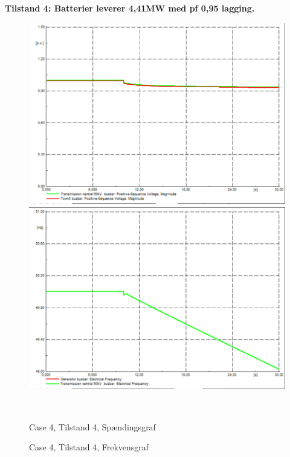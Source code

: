 \textbf{Tilstand 4: Batterier leverer 4,41MW med pf 0,95 lagging.}
\begin{figure}[H]
	\centering
	\begin{minipage}[b]{0.48\textwidth}
		\centering
		\includegraphics[width=1.00\textwidth]{figurer/LargeDisturbanceBatterypark/Voltage4} %
	\end{minipage}
	\hfill
	\begin{minipage}[b]{0.48\textwidth}
		\centering
		\includegraphics[width=1.00\textwidth]{figurer/LargeDisturbanceBatterypark/Freq4} %
	\end{minipage}
	\\ %
	\begin{minipage}[t]{0.48\textwidth}
		\caption{Case 4, Tilstand 4, Spændingsgraf} %
		\label{fig:C4T4V}
	\end{minipage}
	\hfill
	\begin{minipage}[t]{0.48\textwidth}
		\caption{Case 4, Tilstand 4, Frekvensgraf} %
		\label{fig:C4T4F}
	\end{minipage}
\end{figure}

